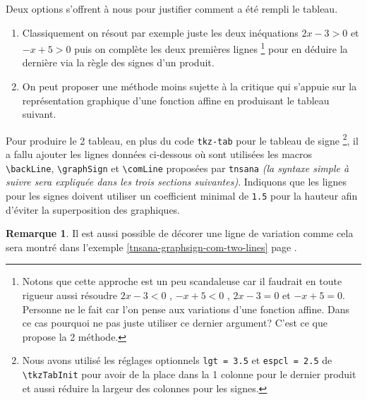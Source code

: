 \documentclass[12pt,a4paper]{article}
\newcommand\env[1]{\texttt{#1}}
\newcommand\macro[1]{\env{\textbackslash{}#1}}
\theoremstyle{definition}
\newtheorem*{remark}{Remarque}
\begin{document}
\begin{center}
	
\end{center}

Deux options s'offrent à nous pour justifier comment a été rempli le tableau.

\begin{enumerate}
    \item Classiquement on résout par exemple juste les deux inéquations $2 x - 3 > 0$ et $-x + 5 > 0$ puis on complète les deux premières lignes
    \footnote{
        Notons que cette approche est un peu scandaleuse car il faudrait en toute rigueur aussi résoudre
        $2 x - 3 < 0$ , $-x + 5 < 0$ , $2 x - 3 = 0$ et $-x + 5 = 0$.
        Personne ne le fait car l'on pense aux variations d'une fonction affine. Dans ce cas pourquoi ne pas juste utiliser ce dernier argument?
        C'est ce que propose la 2\ieme{} méthode.
    }
    pour en déduire la dernière via la règle des signes d'un produit.

    \item On peut proposer une méthode moins sujette à la critique qui s'appuie sur la représentation graphique d'une fonction affine en produisant le tableau suivant.
\end{enumerate}

\begin{center}
	
\end{center}


Pour produire le 2\ieme{} tableau, en plus du code \verb#tkz-tab# pour le tableau de signe
\footnote{
	Nous avons utilisé les réglages optionnels
	\texttt{lgt = 3.5} et \texttt{espcl = 2.5} de \macro{tkzTabInit}
	pour avoir de la place dans la 1\iere{} colonne pour le dernier produit
	et aussi réduire la largeur des colonnes pour les signes.
},
il a fallu ajouter les lignes données ci-dessous où sont utilisées les macros     \macro{backLine}, \macro{graphSign} et \macro{comLine} proposées par \verb+tnsana+ \emph{(la syntaxe simple à suivre sera expliquée dans les trois sections suivantes)}.
	Indiquons que les lignes pour les signes doivent utiliser un coefficient minimal de \texttt{1.5} pour la hauteur afin d'éviter la superposition des graphiques.

\medskip



\begin{remark}
	Il est aussi possible de décorer une ligne de variation comme cela sera montré dans l'exemple \ref{tnsana-graphsign-com-two-lines} page \pageref{tnsana-graphsign-com-two-lines}. 
\end{remark}
\end{document}
